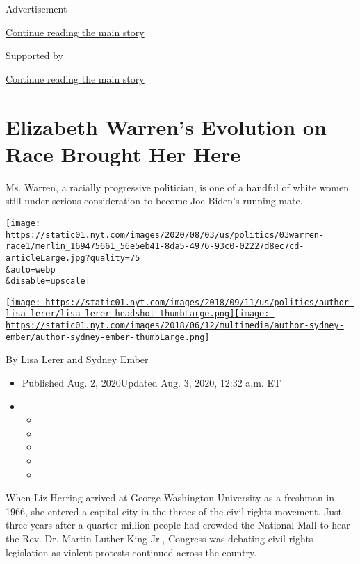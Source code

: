 Advertisement

\protect\hyperlink{after-top}{Continue reading the main story}

Supported by

\protect\hyperlink{after-sponsor}{Continue reading the main story}

\hypertarget{elizabeth-warrens-evolution-on-race-brought-her-here}{%
\section{Elizabeth Warren's Evolution on Race Brought Her
Here}\label{elizabeth-warrens-evolution-on-race-brought-her-here}}

Ms. Warren, a racially progressive politician, is one of a handful of
white women still under serious consideration to become Joe Biden's
running mate.

\texttt{[image: https://static01.nyt.com/images/2020/08/03/us/politics/03warren-race1/merlin\_169475661\_56e5eb41-8da5-4976-93c0-02227d8ec7cd-articleLarge.jpg?quality=75\\\&auto=webp\\\&disable=upscale]}

\href{https://www.nytimes.com/by/lisa-lerer}{\texttt{[image: https://static01.nyt.com/images/2018/09/11/us/politics/author-lisa-lerer/lisa-lerer-headshot-thumbLarge.png]}}\href{https://www.nytimes.com/by/sydney-ember}{\texttt{[image: https://static01.nyt.com/images/2018/06/12/multimedia/author-sydney-ember/author-sydney-ember-thumbLarge.png]}}

By \href{https://www.nytimes.com/by/lisa-lerer}{Lisa Lerer} and
\href{https://www.nytimes.com/by/sydney-ember}{Sydney Ember}

\begin{itemize}
\item
  Published Aug. 2, 2020Updated Aug. 3, 2020, 12:32 a.m. ET
\item
  \begin{itemize}
  \item
  \item
  \item
  \item
  \item
  \end{itemize}
\end{itemize}

When Liz Herring arrived at George Washington University as a freshman
in 1966, she entered a capital city in the throes of the civil rights
movement. Just three years after a quarter-million people had crowded
the National Mall to hear the Rev. Dr. Martin Luther King Jr., Congress
was debating civil rights legislation as violent protests continued
across the country.

